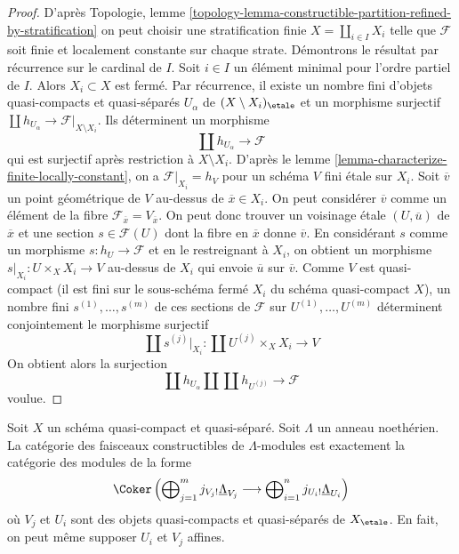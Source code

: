 \begin{proof}
\medskip\noindent
D'apr\`es Topologie, lemme
\ref{topology-lemma-constructible-partition-refined-by-stratification}
on peut choisir une stratification finie
$X = \coprod_{i \in I} X_i$ telle que $\mathcal{F}$ soit finie et localement
constante sur chaque strate. D\'emontrons le r\'esultat par r\'ecurrence sur
le cardinal de $I$. Soit $i \in I$ un \'el\'ement minimal pour l'ordre
partiel de $I$. Alors $X_i \subset X$ est ferm\'e.
Par r\'ecurrence, il existe un nombre fini d'objets quasi-compacts et quasi-s\'epar\'es
$U_\alpha$ de $(X \setminus X_i)_\etale$ et un morphisme surjectif
$\coprod h_{U_\alpha} \to \mathcal{F}|_{X \setminus X_i}$.
Ils d\'eterminent un morphisme
$$
\coprod h_{U_\alpha} \to \mathcal{F}
$$
qui est surjectif apr\`es restriction \`a $X \setminus X_i$. D'apr\`es le
lemme \ref{lemma-characterize-finite-locally-constant},
on a $\mathcal{F}|_{X_i} = h_V$ pour un sch\'ema $V$ fini \'etale
sur $X_i$. Soit $\overline{v}$ un point g\'eom\'etrique de $V$ au-dessus
de $\overline{x} \in X_i$. On peut consid\'erer $\overline{v}$ comme un
\'el\'ement de la fibre $\mathcal{F}_{\overline{x}} = V_{\overline{x}}$.
On peut donc trouver un voisinage \'etale $(U, \overline{u})$
de $\overline{x}$ et une section $s \in \mathcal{F}(U)$ dont la fibre en
$\overline{x}$ donne $\overline{v}$. En consid\'erant $s$ comme un morphisme
$s : h_U \to \mathcal{F}$ et en le restreignant \`a $X_i$, on obtient un morphisme
$s|_{X_i} : U \times_X X_i \to V$ au-dessus de $X_i$ qui envoie $\overline{u}$
sur $\overline{v}$. Comme $V$ est quasi-compact (il est fini sur le sous-sch\'ema
ferm\'e $X_i$ du sch\'ema quasi-compact $X$), un nombre fini
$s^{(1)}, \ldots, s^{(m)}$ de ces sections de $\mathcal{F}$ sur
$U^{(1)}, \ldots, U^{(m)}$ d\'eterminent conjointement le morphisme
surjectif
$$
\coprod s^{(j)}|_{X_i} : \coprod U^{(j)} \times_X X_i \longrightarrow V
$$
On obtient alors la surjection
$$
\coprod h_{U_\alpha} \amalg \coprod h_{U^{(j)}} \to \mathcal{F}
$$
voulue.
\end{proof}

\begin{lemma}
\label{lemma-category-constructible-modules}
Soit $X$ un schéma quasi-compact et quasi-séparé. Soit $\Lambda$
un anneau noethérien. La catégorie des faisceaux constructibles de
$\Lambda$-modules est exactement la catégorie des modules de la forme
$$
\Coker\left(
\bigoplus\nolimits_{j = 1}^m j_{V_j!}\underline{\Lambda}_{V_j}
\longrightarrow
\bigoplus\nolimits_{i = 1}^n j_{U_i!}\underline{\Lambda}_{U_i}
\right)
$$
où $V_j$ et $U_i$ sont des objets quasi-compacts et quasi-séparés de
$X_\etale$. En fait, on peut même supposer $U_i$ et $V_j$ affines.
\end{lemma}

